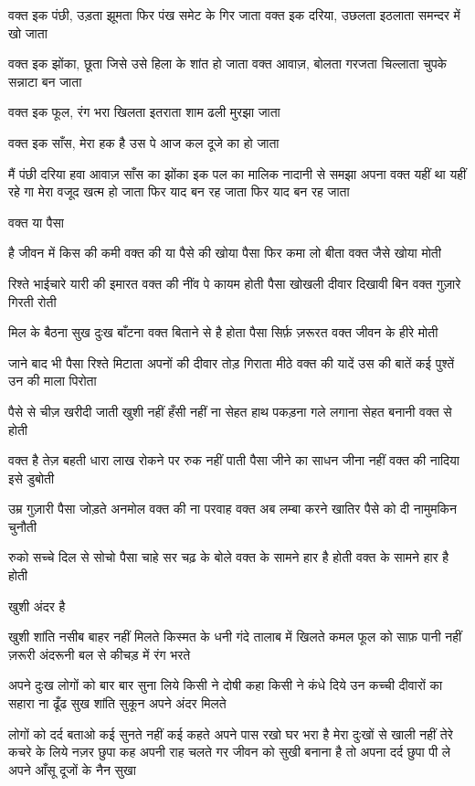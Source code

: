 वक्त इक पंछी, उड़ता झूमता 
फिर पंख समेट के गिर जाता
वक्त इक दरिया, उछलता इठलाता
समन्दर में खो जाता





वक्त इक झोंका, छूता जिसे 
उसे हिला के शांत हो जाता
वक्त आवाज़, बोलता गरजता चिल्लाता
चुपके सन्नाटा बन जाता

वक्त इक फूल, रंग भरा खिलता इतराता
शाम ढली मुरझा जाता

वक्त इक साँस, मेरा हक है उस पे आज
कल दूजे का हो जाता

मैं पंछी दरिया हवा आवाज़ साँस का झोंका
इक पल का मालिक
नादानी से समझा अपना
वक्त यहीं था यहीं रहे गा
मेरा वजूद खत्म हो जाता
फिर याद बन रह जाता
फिर याद बन रह जाता

वक्त या पैसा

है जीवन में किस की कमी
वक्त की या पैसे की
खोया पैसा फिर कमा लो
बीता वक्त जैसे खोया मोती





रिश्ते भाईचारे यारी की इमारत
वक्त की नींव पे कायम होती
पैसा खोखली दीवार दिखावी
बिन वक्त गुज़ारे गिरती रोती

मिल के बैठना सुख दुःख बाँटना
वक्त बिताने से है होता
पैसा सिर्फ़ ज़रूरत
वक्त जीवन के हीरे मोती


जाने बाद भी पैसा रिश्ते मिटाता
अपनों की दीवार तोड़ गिराता
मीठे वक्त की यादें उस की बातें
कई पुश्तें उन की माला पिरोता

पैसे से चीज़ खरीदी जाती
खुशी नहीं हँसी नहीं ना सेहत
हाथ पकड़ना गले लगाना
सेहत बनानी वक्त से होती


वक्त है तेज़ बहती धारा
लाख रोकने पर रुक नहीं पाती
पैसा जीने का साधन जीना नहीं
वक्त की नादिया इसे डुबोती

उम्र गुज़ारी पैसा जोड़ते
अनमोल वक्त की ना परवाह
वक्त अब लम्बा करने खातिर
पैसे को दी नामुमकिन चुनौती


रुको सच्चे दिल से सोचो
पैसा चाहे सर चढ़ के बोले
वक्त के सामने हार है होती
वक्त के सामने हार है होती

खुशी अंदर है

खुशी शांति नसीब बाहर नहीं मिलते
किस्मत के धनी गंदे तालाब में खिलते
कमल फूल को साफ़ पानी नहीं ज़रूरी
अंदरूनी बल से कीचड़ में रंग भरते





अपने दुःख लोगों को बार बार सुना लिये
किसी ने दोषी कहा किसी ने कंधे दिये
उन कच्ची दीवारों का सहारा ना ढूँढ
सुख शांति सुकून अपने अंदर मिलते

लोगों को दर्द बताओ कई सुनते नहीं
कई कहते अपने पास रखो
घर भरा है मेरा दुःखों से
खाली नहीं तेरे कचरे के लिये
नज़र छुपा कह अपनी राह चलते
गर जीवन को सुखी बनाना है
तो अपना दर्द छुपा
 पी ले अपने आँसू
दूजों के नैन सुखा

